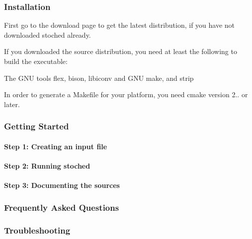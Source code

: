 \subsubsection*{Installation}

First go to the download page to get the latest distribution, if you have not downloaded stoched already.

If you downloaded the source distribution, you need at least the following to build the executable\+:


\begin{DoxyItemize}
\item The G\+NU tools flex, bison, libiconv and G\+NU make, and strip
\item In order to generate a Makefile for your platform, you need cmake version 2.. or later.
\end{DoxyItemize}

\subsubsection*{Getting Started}

\paragraph*{Step 1\+: Creating an input file}

 \paragraph*{Step 2\+: Running stoched}

\paragraph*{Step 3\+: Documenting the sources}

\subsubsection*{Frequently Asked Questions}

\subsubsection*{Troubleshooting}